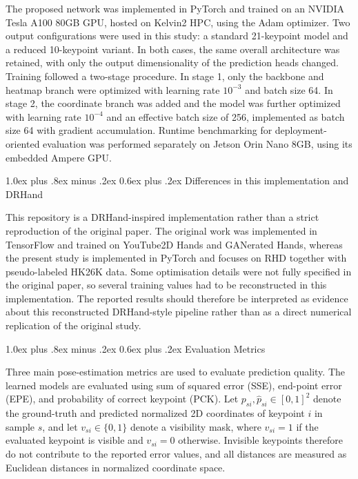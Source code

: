 \documentclass[10pt,letterpaper]{article}
\makeatletter
\renewcommand\subsection{\@startsection{subsection}{2}{\z@}%
  {1.0ex plus .8ex minus .2ex}%
  {0.6ex plus .2ex}%
  {\normalfont\itshape}}
\makeatother
\begin{document}
The proposed network was implemented in PyTorch and trained on an NVIDIA Tesla A100 80GB GPU, hosted on Kelvin2 HPC, using the Adam optimizer. Two output configurations were used in this study: a standard 21-keypoint model and a reduced 10-keypoint variant. In both cases, the same overall architecture was retained, with only the output dimensionality of the prediction heads changed. Training followed a two-stage procedure. In stage 1, only the backbone and heatmap branch were optimized with learning rate \(10^{-3}\) and batch size 64. In stage 2, the coordinate branch was added and the model was further optimized with learning rate \(10^{-4}\) and an effective batch size of 256, implemented as batch size 64 with gradient accumulation. Runtime benchmarking for deployment-oriented evaluation was performed separately on Jetson Orin Nano 8GB, using its embedded Ampere GPU.

\subsection{Differences in this implementation and DRHand}

\noindent This repository is a DRHand-inspired implementation rather than a strict reproduction of the original paper. The original work was implemented in TensorFlow and trained on YouTube2D Hands and GANerated Hands, whereas the present study is implemented in PyTorch and focuses on RHD together with pseudo-labeled HK26K data. Some optimisation details were not fully specified in the original paper, so several training values had to be reconstructed in this implementation. The reported results should therefore be interpreted as evidence about this reconstructed DRHand-style pipeline rather than as a direct numerical replication of the original study.


\subsection{Evaluation Metrics}

\noindent
Three main pose-estimation metrics are used to evaluate prediction quality. The learned models are evaluated using sum of squared error (SSE), end-point error (EPE), and probability of correct keypoint (PCK). Let \(p_{si}, \hat{p}_{si} \in [0,1]^2\) denote the ground-truth and predicted normalized 2D coordinates of keypoint \(i\) in sample \(s\), and let \(v_{si} \in \{0,1\}\) denote a visibility mask, where \(v_{si}=1\) if the evaluated keypoint is visible and \(v_{si}=0\) otherwise. Invisible keypoints therefore do not contribute to the reported error values, and all distances are measured as Euclidean distances in normalized coordinate space.
\end{document}
